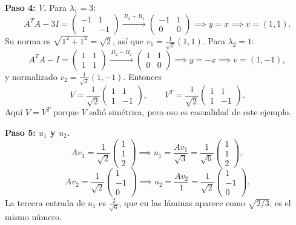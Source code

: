 \documentclass[11pt,letterpaper]{article}
\begin{document}
\begin{ejemplo}
    \textbf{Paso 4: $V$.} Para $\lambda_1 = 3$:
    \[
        A^{T}A - 3I = \begin{pmatrix} -1 & 1 \\ 1 & -1 \end{pmatrix}
        \xrightarrow{\,R_2 + R_1\,}
        \begin{pmatrix} -1 & 1 \\ 0 & 0 \end{pmatrix}
        \implies y = x \implies v = (1, 1) .
    \]
    Su norma es $\sqrt{1^2 + 1^2} = \sqrt{2}$, así que
    $v_1 = \tfrac{1}{\sqrt{2}}(1, 1)$. Para $\lambda_2 = 1$:
    \[
        A^{T}A - I = \begin{pmatrix} 1 & 1 \\ 1 & 1 \end{pmatrix}
        \xrightarrow{\,R_2 - R_1\,}
        \begin{pmatrix} 1 & 1 \\ 0 & 0 \end{pmatrix}
        \implies y = -x \implies v = (1, -1) ,
    \]
    y normalizado $v_2 = \tfrac{1}{\sqrt{2}}(1, -1)$. Entonces
    \[
        V = \frac{1}{\sqrt{2}}
        \begin{pmatrix} 1 & 1 \\ 1 & -1 \end{pmatrix} ,
        \qquad
        V^{T} = \frac{1}{\sqrt{2}}
        \begin{pmatrix} 1 & 1 \\ 1 & -1 \end{pmatrix} .
    \]
    Aquí $V = V^{T}$ porque $V$ salió simétrica, pero eso es
    casualidad de este ejemplo.

    \textbf{Paso 5: $u_1$ y $u_2$.}
    \[
        Av_1 = \frac{1}{\sqrt{2}}
        \begin{pmatrix} 1 \\ 1 \\ 2 \end{pmatrix}
        \implies
        u_1 = \frac{Av_1}{\sqrt{3}}
            = \frac{1}{\sqrt{6}} \begin{pmatrix} 1 \\ 1 \\ 2
            \end{pmatrix} ,
    \]
    \[
        Av_2 = \frac{1}{\sqrt{2}}
        \begin{pmatrix} 1 \\ -1 \\ 0 \end{pmatrix}
        \implies
        u_2 = \frac{Av_2}{1}
            = \frac{1}{\sqrt{2}} \begin{pmatrix} 1 \\ -1 \\ 0
            \end{pmatrix} .
    \]
    La tercera entrada de $u_1$ es $\tfrac{2}{\sqrt{6}}$, que en las
    láminas aparece como $\sqrt{2/3}$; es el mismo número.


\end{ejemplo}
\end{document}
